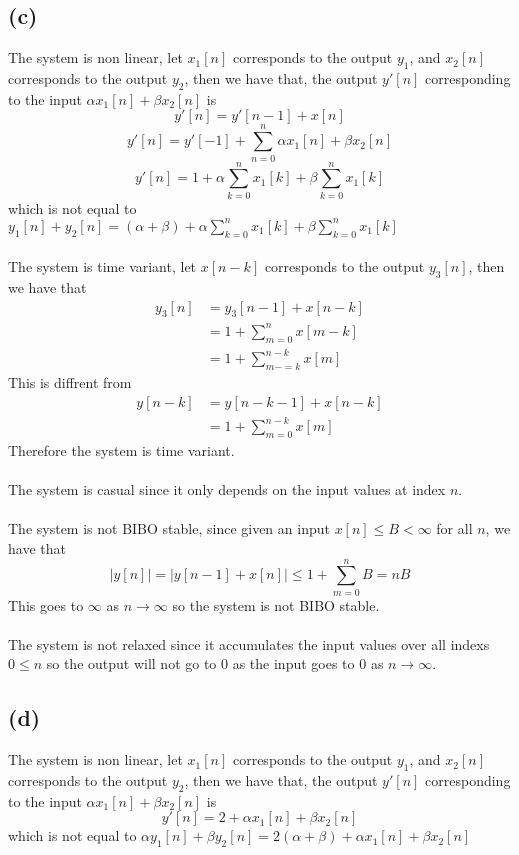 \subsection*{(c)}
The system is non linear, let 
$x_1[n]$ corresponds to the output $y_1$, and $x_2[n]$ corresponds to the output $y_2$, then we have that, 
the output $y'[n]$ corresponding to the input $\alpha x_1[n]+\beta x_2[n]$ is
$$y'[n]=y'[n-1]+x[n]$$
$$y'[n]=y'[-1]+\sum_{n=0}^{n}\alpha x_1[n]+\beta x_2[n]$$
$$y'[n]=1+\alpha\sum_{k=0}^{n}x_1[k]+\beta\sum_{k=0}^{n}x_1[k]$$
which is not equal to $y_1[n]+y_2[n]=(\alpha+\beta)+\alpha\sum_{k=0}^{n}x_1[k]+\beta\sum_{k=0}^{n}x_1[k]$\\\\
The system is time variant, let $x[n-k]$ corresponds to the output $y_3[n]$, then we have that
\begin{align*}
    y_3[n]&=y_3[n-1]+x[n-k]\\
    &=1+\sum_{m=0}^{n}x[m-k]\\
    &=1+\sum_{m-=k}^{n-k}x[m]
\end{align*}
This is diffrent from 
\begin{align*}
    y[n-k]&=y[n-k-1]+x[n-k]\\
    &=1+\sum_{m=0}^{n-k}x[m]
\end{align*}
Therefore the system is time variant.\\\\
The system is casual since it only depends on the input values at index $n$.\\\\
The system is not BIBO stable, since given an input $x[n]\leq B<\infty$ for all $n$, we have that
$$|y[n]|=|y[n-1]+x[n]|\leq 1+\sum_{m=0}^{n}B =nB$$
This goes to $\infty$ as $n\to\infty$ so the system is not BIBO stable.\\\\
The system is not relaxed since it accumulates the input values over all indexs $0\leq n$ so
the output will not go to $0$ as the input goes to $0$ as $n\to\infty$.
\subsection*{(d)}
The system is non linear, let 
$x_1[n]$ corresponds to the output $y_1$, and $x_2[n]$ corresponds to the output $y_2$, then we have that, 
the output $y'[n]$ corresponding to the input $\alpha x_1[n]+\beta x_2[n]$ is
$$y'[n]=2+\alpha x_1[n]+\beta x_2[n]$$
which is not equal to $\alpha y_1[n]+\beta y_2[n]=2(\alpha+\beta)+\alpha x_1[n]+\beta x_2[n]$\\\\

